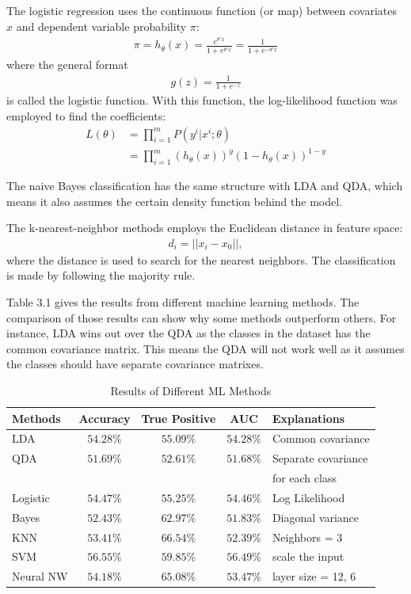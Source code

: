 \documentclass[12pt]{article}
\theoremstyle{definition}
\numberwithin{equation}{section}
\numberwithin{figure}{section}
\numberwithin{table}{section}
\begin{document}
The logistic regression uses the continuous function (or map) between covariates $x$ and dependent variable probability $\pi$:
\begin{align}
  \pi = h_{\theta}(x) = \frac{e^{\theta' x}}{ 1 + e^{\theta' x}} = \frac{1}{1+ e^{-\theta' x}}
\end{align}
where the general format
\begin{align*}
  g(z) = \frac{1}{1+e^{-z}}
\end{align*}
is called the logistic function. With this function, the log-likelihood function was employed to find the coefficients:
\begin{align*}
  L(\theta) & = \prod_{i=1}^m P(y^{i}| x^{i}; \theta) \\
  & = \prod_{i=1}^m (h_{\theta}(x))^y (1 - h_{\theta}(x))^{1-y}
\end{align*}

The naive Bayes classification has the same structure with LDA and QDA, which means it also assumes the certain density function behind the model. 

The k-nearest-neighbor methods employs the Euclidean distance in feature space:
\begin{align*}
	d_i = || x_i - x_0 ||, 
\end{align*}
where the distance is used to search for the nearest neighbors. The classification is made by following the majority rule. 

Table 3.1 gives the results from different machine learning methods. The comparison of those results can show why some methods outperform others. For instance, LDA wins out over the QDA as the classes in the dataset has the common covariance matrix. This means the QDA will not work well as it assumes the classes should have separate covariance matrixes.
\begin{table}[H]
	\centering
	\renewcommand{\arraystretch}{1.2}
	\caption{Results of Different ML Methods}
			\begin{tabular}{lcccl}
		\hline 
		\hline 
		Methods & Accuracy & True Positive & AUC  &  Explanations\\
		\hline 
		LDA &  $54.28\%$& $55.09\%$ & $54.28\%$& Common covariance 
\\
		\hline 
		QDA &  $51.69\%$ & $52.61\%$ & $51.68\%$&Separate covariance  \\
		& & & & for each class \\
		\hline 
		Logistic &  $54.47\%$ & $55.25\%$ &$54.46\%$ & Log Likelihood\\
		\hline 
		Bayes & $52.43\%$ & $62.97\%$ & $51.83\%$&Diagonal variance \\
		\hline 
		KNN & $53.41\%$ & $66.54\%$ &$52.39\%$ & Neighbors = 3 \\
		\hline 
		SVM & $56.55\%$ & $59.85\%$ & $56.49\%$ & scale the input\\
		\hline 
		Neural NW & $54.18\%$ & $65.08\%$ & $53.47\%$ & layer size = 12, 6\\
		\hline 
	\end{tabular} 
\end{table}










\newpage


\end{document}
